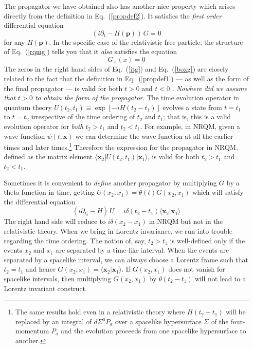 \documentclass[12pt]{article}
\def\eq#1{{Eq.~(\ref{#1})}}
\def\bk#1#2#3{{\langle #1|#2|#3\rangle}}  %
\def\amp#1#2{\langle #1 | #2\rangle}      %
\begin{document}
The propagator we have obtained also has another nice property which arises directly from the definition in \eq{propdef2}. It satisfies the \textit{first order} differential equation 
 \begin{equation}
 (i \partial_t - H(\bm {p}) )\, G =0
 \label{itg}
\end{equation} 
for any $H(\bm {p})$. In the specific case of the relativistic free particle, the structure of \eq{rqmg} tells you that it \textit{also} satisfies the equation
\begin{equation}
[\partial_a\partial^a + m^2] G_+(x)=0
\label{boxg}
\end{equation} 
The zeros in the right hand sides of \eq{itg} and \eq{boxg} are closely related to the fact that the definition in \eq{propdef1} --- as well as the form of the final propagator --- is valid for both $t>0$ and $t<0$ . \textit{Nowhere did we assume that $t>0$ to obtain the form of the propagator.} 
The time evolution operator in quantum theory 
 $U(t_2,t_1) \equiv \exp[-iH(t_2-t_1)]$ evolves a state from $t=t_1 $ to $t=t_2$ irrespective of the time ordering of $t_2$ and $t_1$; that is, this is a valid evolution operator for \textit{both} $t_2>t_1$ and $t_2<t_1$. For example, in NRQM, given a wave function $\psi(t,\bm{x})$ we can determine the wave function at all the earlier times and later times.\footnote{The same results hold even in a relativistic theory where $H(t_2-t_1)$ will be replaced by an integral of $d\Sigma^a P_a$ over a spacelike hypersurface $\Sigma$ of the four-momentum $P_a$ and the evolution proceeds from one spacelike hypersurface to another.}
 Therefore the expression for the  propagator in NRQM, defined as the matrix element $\bk{\bm{x}_2}{U(t_2,t_1)}{\bm{x}_1}$, is valid for both $t_2>t_1$ and $t_2<t_1$. 
 
 
Sometimes it is convenient to \textit{define} another propagator by multiplying $G$ by a theta function in time, getting $U(x_2,x_1)=\theta(t)G(x_2,x_1)$ which will satisfy the differential equation
 \begin{equation}
 (i \partial_{t_2} - H)\, U =i\delta(t_2-t_1)\amp{\bm{x}_2}{\bm{x}_1}
\end{equation}
The right hand side will reduce to $i\delta(x_2-x_1)$ in NRQM but not in the relativistic theory.
When we bring in Lorentz invariance, we run into trouble regarding the time ordering. The notion of, say, $t_2>t_1$ is well-defined only if the events $x_2$ and $x_1$ are separated by a time-like interval. When the events are separated by a spacelike interval, we can always choose a Lorentz frame such that $t_2 = t_1$ and hence $G(x_2,x_1) = \amp{\bm{x}_2}{\bm{x}_1}$. If  $G(x_2,x_1) $ does not vanish for spacelike intervals, then multiplying $G(x_2,x_1)$ by $\theta (t_2-t_1)$ will not lead to a Lorentz invariant construct. 
\end{document}
